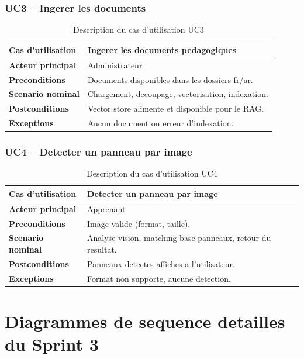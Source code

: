 \documentclass[a4paper,12pt]{report}
\begin{document}
\subsubsection{UC3 -- Ingerer les documents}
\begin{table}[H]
  \centering
  \caption{Description du cas d'utilisation UC3}
  \begin{tabularx}{\textwidth}{>{\bfseries}p{4cm} X}
    \toprule
    Cas d'utilisation & Ingerer les documents pedagogiques \\
    \midrule
    Acteur principal & Administrateur \\
    Preconditions & Documents disponibles dans les dossiers fr/ar. \\
    Scenario nominal & Chargement, decoupage, vectorisation, indexation. \\
    Postconditions & Vector store alimente et disponible pour le RAG. \\
    Exceptions & Aucun document ou erreur d'indexation. \\
    \bottomrule
  \end{tabularx}
\end{table}

\subsubsection{UC4 -- Detecter un panneau par image}
\begin{table}[H]
  \centering
  \caption{Description du cas d'utilisation UC4}
  \begin{tabularx}{\textwidth}{>{\bfseries}p{4cm} X}
    \toprule
    Cas d'utilisation & Detecter un panneau par image \\
    \midrule
    Acteur principal & Apprenant \\
    Preconditions & Image valide (format, taille). \\
    Scenario nominal & Analyse vision, matching base panneaux, retour du resultat. \\
    Postconditions & Panneaux detectes affiches a l'utilisateur. \\
    Exceptions & Format non supporte, aucune detection. \\
    \bottomrule
  \end{tabularx}
\end{table}

\section{Diagrammes de sequence detailles du Sprint 3}
\end{document}
